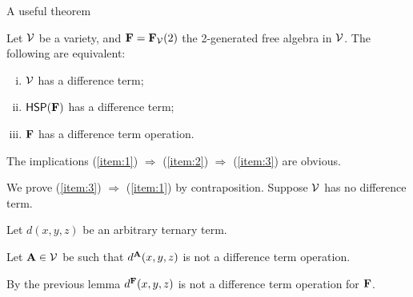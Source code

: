 \documentclass[12pt,xcolor=dvipsnames%
   ]{beamer}
\begin{document}
\begin{frame}[shrink=25]{A useful theorem}
\begin{theorem}
  \label{thm:F}
  Let $\mathcal{V}$ be a variety, and $\mathbf{F} = \mathbf{F}_{\mathcal{V}}(2)$ the 2-generated
  free algebra in $\mathcal{V}$. The following are equivalent:
  \begin{enumerate}[(i)]
  \item \label{item:1}
    $\mathcal{V}$ has a difference term;
  \item \label{item:2}
    $\mathsf{H} \mathsf{S} \mathsf{P} (\mathbf{F})$ has a difference term;
  \item \label{item:3}
    $\mathbf{F}$ has a difference term operation.
  \end{enumerate}
\end{theorem}
  The implications
  (\ref{item:1}) $\Rightarrow$  (\ref{item:2}) $\Rightarrow$  (\ref{item:3}) are
  obvious. 

  \vskip2mm
  \pause 
  We prove
  (\ref{item:3}) $\Rightarrow$  (\ref{item:1}) by contraposition.
  Suppose $\mathcal{V}$ has no difference term. 

  \vskip2mm
  Let $d(x,y,z)$ be an arbitrary ternary term.
  
  \vskip2mm
  Let $\mathbf{A}\in \mathcal{V}$ be such that $d^{\mathbf{A}}(x,y,z)$ is not a difference term
  operation. 

  \vskip2mm
  By the previous lemma %
  $d^{\mathbf{F}}(x,y,z)$ is not a difference term operation for $\mathbf{F}$.
\end{frame}
\end{document}

